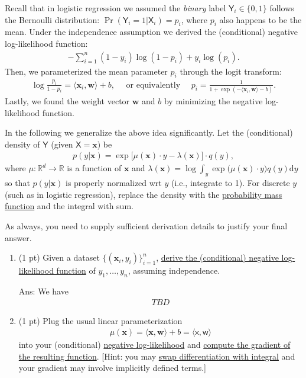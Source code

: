\documentclass[10pt,letter,notitlepage]{article}
\newcommand{\RR}{\mathds{R}}
\newcommand{\wv}{\mathbf{w}}
\newcommand{\xv}{\mathbf{x}}
\newcommand{\inner}[2]{\langle #1, #2 \rangle}
\newcommand{\red}[1]{{\color{red}#1}}
\newcommand{\xbs}{\bm{\mathsf{x}}}
\newcommand{\wbs}{\bm{\mathsf{w}}}
\newcommand{\Ysf}{\mathsf{Y}}
\newcommand{\Xsf}{\mathsf{X}}
\newcommand{\ans}[1]{{\color{orange}\textsf{Ans}: #1}}
\begin{document}
\begin{exercise}
Recall that in logistic regression we assumed the \emph{binary} label $\Ysf_i \in \{0,1\}$ follows the Bernoulli distribution: $\Pr(\Ysf_i = 1 | \Xsf_i) = p_i$, where $p_i$ also happens to be the mean. Under the independence assumption we derived the (conditional) negative log-likelihood function:
\begin{align}
-\sum_{i=1}^n (1-y_i) \log(1-p_i) + y_i \log(p_i).
\end{align}
Then, we parameterized the mean parameter $p_i$ through the logit transform:
\begin{align}
\log\frac{p_i}{1-p_i} = \inner{\xv_i}{\wv} + b, \quad \mbox{ or equivalently } \quad p_i = \frac{1}{1+\exp(-\inner{\xv_i}{\wv} - b)}.
\end{align}
Lastly, we found the weight vector $\wv$ and $b$ by minimizing the negative log-likelihood function.

In the following we generalize the above idea significantly. Let the (conditional) density of $\Ysf$ (given $\Xsf= \xv$) be
\begin{align}
p(y| \xv) = \exp\Big[ \mu(\xv)\cdot y - \lambda(\xv) \Big] \cdot q(y),
\end{align}
where $\mu:\RR^d \to \RR$ is a function of $\xv$ and $\lambda(\xv) = \log \int_y \exp\big( \mu(\xv) \cdot y \big)  q(y) \mathrm{d} y$ so that $p(y|\xv)$ is properly normalized wrt $y$ (i.e., integrate to 1). For discrete $y$ (such as in logistic regression), replace the density with the \href{https://en.wikipedia.org/wiki/Probability_mass_function}{probability mass function} and the integral with sum.

\red{As always, you need to supply sufficient derivation details to justify your final answer.}

\begin{enumerate}
\item (1 pt) Given a dataset $\{(\xv_i, y_i)\}_{i=1}^n$, \uline{derive the (conditional) negative log-likelihood function} of $y_1, \ldots, y_n$, assuming independence. 

\ans{We have 
\begin{align}
TBD 
\end{align}
}

\item (1 pt) Plug the usual linear parameterization 
\begin{align}
\mu(\xv) = \inner{\xv}{\wv} + b = \inner{\xbs}{\wbs}
\end{align}
into your (conditional) \uline{negative log-likelihood} and \uline{compute the gradient of the resulting function}. [Hint: you may \href{https://en.wikipedia.org/wiki/Leibniz_integral_rule}{swap differentiation with integral} and your gradient may involve implicitly defined terms.]


\end{enumerate}
\end{exercise}
\end{document}
